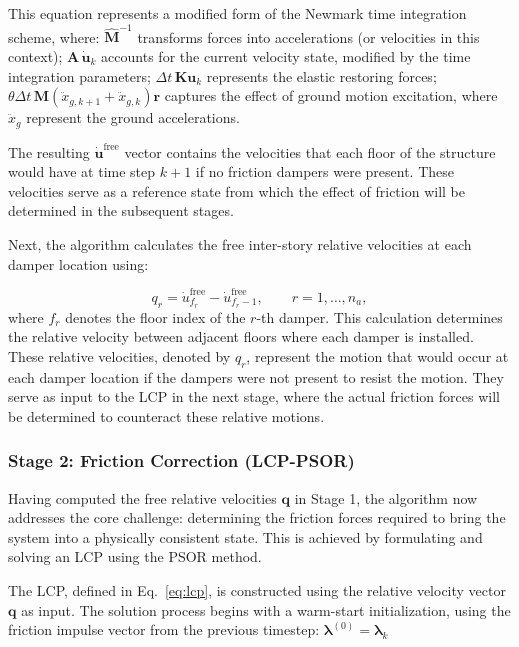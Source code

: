 \documentclass[preprint,12pt,authoryear]{elsarticle}
\begin{document}
This equation represents a modified form of the Newmark time integration scheme, where: \(\hat{\bm{M}}^{-1}\) transforms forces into accelerations (or velocities in this context); \(\bm{A}\,\dot{\bm{u}}_k\) accounts for the current velocity state, modified by the time integration parameters; \(\Delta t\,\bm{K}\bm{u}_k\) represents the elastic restoring forces; $\theta\Delta t\,\bm{M}\!\left(\ddot{x}_{g,k+1}+\ddot{x}_{g,k}\right)\bm{r}$ captures the effect of ground motion excitation, where $\ddot{x}_{g}$ represent the ground accelerations.

The resulting \(\dot{\bm{u}}^{\mathrm{free}}\) vector contains the velocities that each floor of the structure would have at time step \(k+1\) if no friction dampers were present. These velocities serve as a reference state from which the effect of friction will be determined in the subsequent stages.

Next, the algorithm calculates the free inter-story relative velocities at each damper location using:

\begin{equation}
	q_r = \dot{u}^{\mathrm{free}}_{f_r} - \dot{u}^{\mathrm{free}}_{f_r - 1},
	\qquad r = 1,\ldots,n_a,
	\label{eq:qr}
\end{equation}
where $f_r$ denotes the floor index of the $r$-th damper. This calculation determines the relative velocity between adjacent floors where each damper is installed. These relative velocities, denoted by $q_r$, represent the motion that would occur at each damper location if the dampers were not present to resist the motion. They serve as input to the LCP in the next stage, where the actual friction forces will be determined to counteract these relative motions.

\subsubsection*{Stage 2: Friction Correction (LCP-PSOR)}
\label{sec:theory:friction_correction}

Having computed the free relative velocities $\bm{q}$ in Stage 1, the algorithm now addresses the core challenge: determining the friction forces required to bring the system into a physically consistent state. This is achieved by formulating and solving an LCP using the PSOR method.

The LCP, defined in Eq.~\ref{eq:lcp}, is constructed using the relative velocity vector $\bm{q}$ as input. The solution process begins with a warm-start initialization, using the friction impulse vector from the previous timestep:
$\bm{\lambda}^{(0)} = \bm{\lambda}_k$
\end{document}
